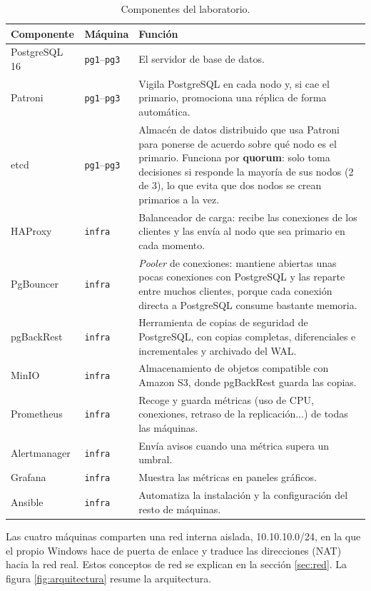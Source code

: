 \documentclass[11pt, a4paper, titlepage]{article}
\newcommand{\cod}[1]{\texttt{#1}}
\begin{document}
\begin{table}[H]
\centering
\small
\begin{tabular}{llp{9.2cm}}
\toprule
\textbf{Componente} & \textbf{Máquina} & \textbf{Función} \\
\midrule
PostgreSQL 16 & \cod{pg1}--\cod{pg3} & El servidor de base de datos. \\
Patroni & \cod{pg1}--\cod{pg3} & Vigila PostgreSQL en cada nodo y, si cae el primario, promociona una réplica de forma automática. \\
etcd & \cod{pg1}--\cod{pg3} & Almacén de datos distribuido que usa Patroni para ponerse de acuerdo sobre qué nodo es el primario. Funciona por \textbf{quorum}: solo toma decisiones si responde la mayoría de sus nodos (2 de 3), lo que evita que dos nodos se crean primarios a la vez. \\
HAProxy & \cod{infra} & Balanceador de carga: recibe las conexiones de los clientes y las envía al nodo que sea primario en cada momento. \\
PgBouncer & \cod{infra} & \textit{Pooler} de conexiones: mantiene abiertas unas pocas conexiones con PostgreSQL y las reparte entre muchos clientes, porque cada conexión directa a PostgreSQL consume bastante memoria. \\
pgBackRest & \cod{infra} & Herramienta de copias de seguridad de PostgreSQL, con copias completas, diferenciales e incrementales y archivado del WAL. \\
MinIO & \cod{infra} & Almacenamiento de objetos compatible con Amazon S3, donde pgBackRest guarda las copias. \\
Prometheus & \cod{infra} & Recoge y guarda métricas (uso de CPU, conexiones, retraso de la replicación...) de todas las máquinas. \\
Alertmanager & \cod{infra} & Envía avisos cuando una métrica supera un umbral. \\
Grafana & \cod{infra} & Muestra las métricas en paneles gráficos. \\
Ansible & \cod{infra} & Automatiza la instalación y la configuración del resto de máquinas. \\
\bottomrule
\end{tabular}
\caption{Componentes del laboratorio.}
\label{tab:componentes}
\end{table}

Las cuatro máquinas comparten una red interna aislada, 10.10.10.0/24, en la que el propio Windows hace de puerta de enlace y traduce las direcciones (NAT) hacia la red real. Estos conceptos de red se explican en la sección \ref{sec:red}. La figura \ref{fig:arquitectura} resume la arquitectura.
\end{document}
